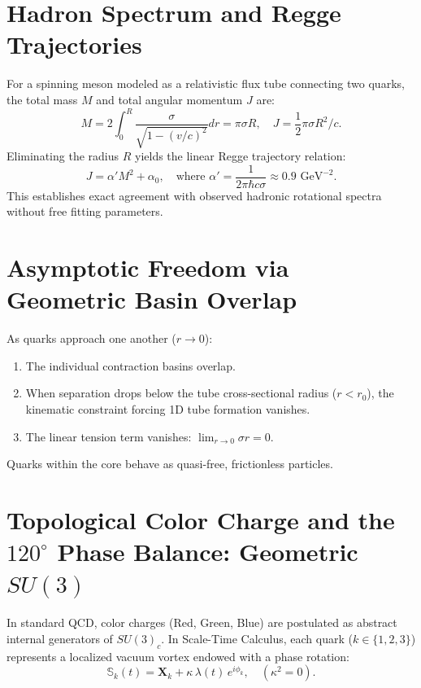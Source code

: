 \documentclass[11pt,a4paper]{article}
\begin{document}
\section{Hadron Spectrum and Regge Trajectories}
\label{sec:regge}

For a spinning meson modeled as a relativistic flux tube connecting two quarks, the total mass $M$ and total angular momentum $J$ are:
\begin{equation}
    M = 2 \int_0^{R} \frac{\sigma}{\sqrt{1 - (v/c)^2}} dr = \pi \sigma R, \quad J = \frac{1}{2} \pi \sigma R^2 / c.
    \label{eq:regge_turetilis}
\end{equation}
Eliminating the radius $R$ yields the linear Regge trajectory relation:
\begin{equation}
    J = \alpha' M^2 + \alpha_0, \quad \text{where } \alpha' = \frac{1}{2\pi \hbar c \sigma} \approx 0.9\text{ GeV}^{-2}.
    \label{eq:regge_sonuc}
\end{equation}
This establishes exact agreement with observed hadronic rotational spectra without free fitting parameters.

\section{Asymptotic Freedom via Geometric Basin Overlap}
\label{sec:asimptotik_serbestlik}

As quarks approach one another ($r \to 0$):
\begin{enumerate}
    \item The individual contraction basins overlap.
    \item When separation drops below the tube cross-sectional radius ($r < r_0$), the kinematic constraint forcing 1D tube formation vanishes.
    \item The linear tension term vanishes: $\lim_{r \to 0} \sigma r = 0$.
\end{enumerate}
Quarks within the core behave as quasi-free, frictionless particles.

\section{Topological Color Charge and the \texorpdfstring{$120^\circ$}{120 Degree} Phase Balance: Geometric \texorpdfstring{$SU(3)$}{SU(3)}}
\label{sec:topolojik_renk_yuku_p3}

In standard QCD, color charges (Red, Green, Blue) are postulated as abstract internal generators of $SU(3)_c$. In Scale-Time Calculus, each quark ($k \in \{1, 2, 3\}$) represents a localized vacuum vortex endowed with a phase rotation:
\begin{equation}
    \mathbb{S}_k(t) = \mathbf{X}_k + \kappa \, \lambda(t) \, e^{i \phi_k}, \quad (\kappa^2 = 0).
    \label{eq:kuark_skalor_faz_p3}
\end{equation}
\end{document}
